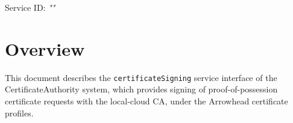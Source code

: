 \documentclass[a4paper]{arrowhead}
\begin{document}
\sloppy

\ArrowheadSetup

\begin{center}
  \vspace*{1cm}
  \huge{\arrowtitle}

  \vspace*{0.2cm}
  \LARGE{\arrowtype}
  \vspace*{1cm}

  \Large{Service ID: \textit{"\arrowid"}}

  \vspace*{\fill}


  \vspace*{1cm}
  \vspace*{\fill}

  \begin{abstract}
    This document describes the HTTP/1.1 protocol with TLS payload security and JSON payload encoding variant of the \texttt{certificateSigning} service of the CertificateAuthority system.
  \end{abstract}

  \vspace*{1cm}
\end{center}

\newpage

\tableofcontents
\newpage

\section{Overview}
\label{sec:overview}

This document describes the \texttt{certificateSigning} service interface of the CertificateAuthority system, which provides signing of proof-of-possession certificate requests with the local-cloud CA, under the Arrowhead certificate profiles.
\end{document}
